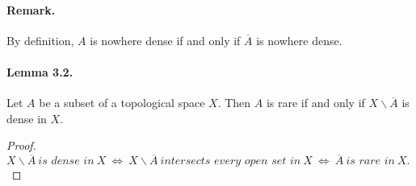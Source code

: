 \documentclass{article}
\begin{document}
\paragraph{Remark.} By definition, $A$ is nowhere dense if and only if $\overline{A}$ is nowhere dense. 
\paragraph{Lemma 3.2.\label{lemma:3.2}} Let $A$ be a subset of a topological space $X$. Then $A$ is rare if and only if $X\backslash\overline{A}$ is dense in $X$.
\begin{proof}
$X\backslash\overline{A}\ \textit{is dense in}\ X\ \Leftrightarrow\ X\backslash\overline{A}\ \textit{intersects every open set in}\ X\ \Leftrightarrow\ \overline{A}\ \textit{is rare in}\ X.$
\end{proof}
\end{document}
